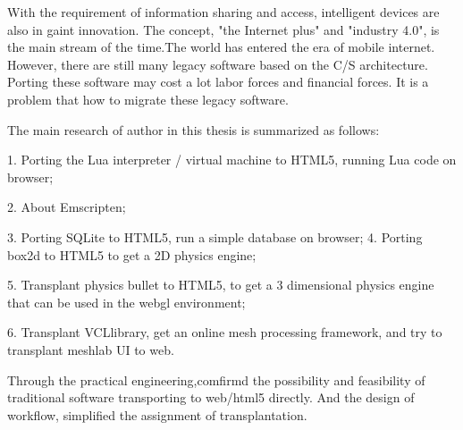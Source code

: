 \begin{eabstract}
With the requirement of information sharing and access,
intelligent devices are also in gaint innovation.
The concept, "the Internet plus" and "industry 4.0",
is the main stream of the time.The world has entered the era of mobile internet.
However, there are still many legacy software based on the C/S architecture.
Porting these software may cost a lot labor forces and financial forces.
It is a problem that how to migrate these legacy software.

\par
The main research of author in this thesis is summarized as follows:


1. Porting the Lua interpreter / virtual machine to HTML5, running Lua code on browser;\par
2. About Emscripten;\par
3. Porting SQLite to HTML5, run a simple database on browser;
4. Porting box2d to HTML5 to get a 2D physics engine;\par
5. Transplant physics bullet to HTML5, to get a 3 dimensional physics engine that can be used in the webgl environment;\par
6. Transplant VCLlibrary, get an online mesh processing framework, and try to transplant meshlab UI to web.

\par
Through the practical engineering,comfirmd the possibility and feasibility
of traditional software transporting to web/html5 directly.
And the design of workflow, simplified the assignment of transplantation.
\end{eabstract}